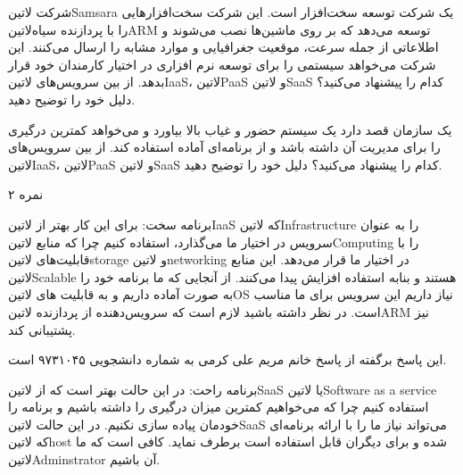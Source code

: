 

شرکت ‌لاتین{Samsara} یک شرکت توسعه سخت‌افزار است. این شرکت سخت‌افزارهایی را با پردازنده ‌سیاه{‌لاتین{ARM}} توسعه می‌دهد که بر روی ماشین‌ها نصب می‌شوند
و اطلاعاتی از جمله سرعت، موقعیت جغرافیایی و موارد مشابه را ارسال می‌کنند. این شرکت می‌خواهد سیستمی را برای توسعه نرم افزاری در اختیار کارمندان خود قرار بدهد.
از بین سرویس‌های ‌لاتین{IaaS}، ‌لاتین{PaaS} و ‌لاتین{SaaS} کدام را پیشنهاد می‌کنید؟ دلیل خود را توضیح دهید.


یک سازمان قصد دارد یک سیستم حضور و غیاب بالا بیاورد و می‌خواهد کمترین درگیری را برای مدیریت آن داشته باشد و از برنامه‌ای آماده استفاده کند.
از بین سرویس‌های ‌لاتین{IaaS}، ‌لاتین{PaaS} و ‌لاتین{SaaS} کدام را پیشنهاد می‌کنید؟ دلیل خود را توضیح دهید.

۲ نمره

\begin{پاسخ}


برنامه سخت: برای این کار بهتر از ‌لاتین{IaaS} که ‌لاتین{Infrastructure} را به عنوان سرویس در اختیار ما می‌گذارد، استفاده کنیم
چرا که منابع ‌لاتین{Computing} را با قابلیت‌های ‌لاتین{storage} و ‌لاتین{networking} در اختیار ما قرار می‌دهد.
این منابع ‌لاتین{Scalable} هستند و بنابه استفاده افزایش پیدا می‌کنند.
از آنجایی که ما برنامه خود را به صورت آماده داریم و به قابلیت های ‌لاتین{OS} نیاز داریم این سرویس برای ما مناسب است.
در نظر داشته باشید لازم است که سرویس‌دهنده از پردازنده ‌لاتین{ARM} نیز پشتیبانی کند.

این پاسخ برگفته از پاسخ خانم مریم علی کرمی به شماره دانشجویی ۹۷۳۱۰۴۵ است.

برنامه راحت: در این حالت بهتر است که از ‌لاتین{SaaS} یا ‌لاتین{Software as a service} استفاده کنیم چرا که می‌خواهیم
کمترین میزان درگیری را داشته باشیم و برنامه را خودمان پیاده سازی نکنیم.
در این حالت ‌لاتین{SaaS} می‌تواند نیاز ما را با ارائه برنامه‌ای که
‌لاتین{host} شده و برای دیگران قابل استفاده است برطرف نماید. کافی است که ما ‌لاتین{Adminstrator} آن
باشیم.

\end{پاسخ}
